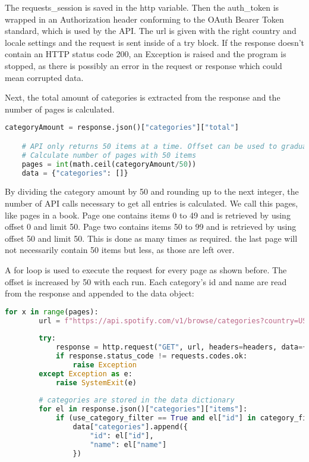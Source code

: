 The requests\_session is saved in the http variable. Then the auth\_token is wrapped in an Authorization header
conforming to the OAuth Bearer Token standard, which is used by the API.
The url is given with the right country and locale settings and the request is sent inside of a try block.
If the response doesn't contain an HTTP status code 200, an Exception is raised and the program is stopped,
as there is possibly an error in the request or response which could mean corrupted data.

Next, the total amount of categories is extracted from the response and the number of pages is calculated.

\begin{lstlisting}[language=Python]
    categoryAmount = response.json()["categories"]["total"]

    # API only returns 50 items at a time. Offset can be used to gradually get all items
    # Calculate number of pages with 50 items
    pages = int(math.ceil(categoryAmount/50))
    data = {"categories": []}
\end{lstlisting}

By dividing the category amount by 50 and rounding up to the next integer, the number of API calls necessary to get 
all entries is calculated. We call this pages, like pages in a book. Page one contains items 0 to 49 and is retrieved by
using offset 0 and limit 50. Page two contains items 50 to 99 and is retrieved by using offset 50 and limit 50.
This is done as many times as required. the last page will not necessarily contain 50 items but less, as those are left over.

A for loop is used to execute the request for every page as shown before. The offset is increased by 50 with each run.
Each category's id and name are read from the response and appended to the data object:

\begin{lstlisting}[language=Python]
    for x in range(pages):
        url = f"https://api.spotify.com/v1/browse/categories?country=US&locale=en_US&limit=50&offset={x * 50}"
        
        try:
            response = http.request("GET", url, headers=headers, data={})
            if response.status_code != requests.codes.ok:
                raise Exception
        except Exception as e:
            raise SystemExit(e)
        
        # categories are stored in the data dictionary
        for el in response.json()["categories"]["items"]:
            if (use_category_filter == True and el["id"] in category_filter) or use_category_filter == False:
                data["categories"].append({
                    "id": el["id"], 
                    "name": el["name"]
                })
\end{lstlisting}

